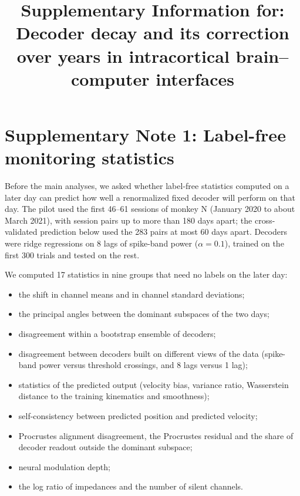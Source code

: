 \documentclass[pdflatex,sn-nature]{sn-jnl}
\begin{document}
\title[Supplementary Information]{Supplementary Information for: Decoder decay and its correction over years in
intracortical brain--computer interfaces}

\author*[1]{ }
\author[1]{ }
\author[1]{ }


\maketitle

\section*{Supplementary Note 1: Label-free monitoring statistics}

Before the main analyses, we asked whether label-free statistics computed on a later day can predict how well a
renormalized fixed decoder will perform on that day. The pilot used the first 46--61 sessions of monkey N
(January 2020 to about March 2021), with session pairs up to more than 180 days apart; the cross-validated prediction
below used the 283 pairs at most 60 days apart. Decoders were ridge regressions on 8
lags of spike-band power ($\alpha = 0.1$), trained on the first 300 trials and tested on the rest.

We computed 17 statistics in nine groups that need no labels on the later day:
\begin{itemize}
\item the shift in channel means and in channel standard deviations;
\item the principal angles between the dominant subspaces of the two days;
\item disagreement within a bootstrap ensemble of decoders;
\item disagreement between decoders built on different views of the data (spike-band power versus threshold
crossings, and 8 lags versus 1 lag);
\item statistics of the predicted output (velocity bias, variance ratio, Wasserstein distance to the training
kinematics and smoothness);
\item self-consistency between predicted position and predicted velocity;
\item Procrustes alignment disagreement, the Procrustes residual and the share of decoder readout outside the
dominant subspace;
\item neural modulation depth;
\item the log ratio of impedances and the number of silent channels.
\end{itemize}
\end{document}
